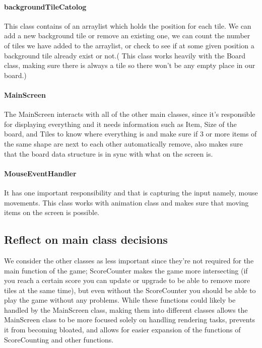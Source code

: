 \documentclass{article}
\begin{document}
\paragraph{backgroundTileCatolog} This class contains of an arraylist which holds the position for each tile. We can add a new background tile or remove an existing one, we can count the number of tiles we have added to the arraylist, or check to see if at some given position a background tile already exist or not.( This class works heavily with the Board class, making sure there is always a tile so there won’t be any empty place in our board.)


\paragraph{MainScreen} The MainScreen interacts with all of the other main classes, since it’s responsible for displaying everything and it needs information such as Item, Size of the board, and Tiles to know where everything is and make sure if 3 or more items of the same shape are next to each other automatically remove, also makes sure that the board data structure is in sync with what on the screen is.



\paragraph{MouseEventHandler}  It has one important responsibility and that is capturing the input namely, mouse movements. This class works with animation class and makes sure that moving items on the screen is possible.

\subsection{Reflect on main class decisions}
We consider the other classes as less important since they’re not required for the main function of the game; ScoreCounter makes the game more intersecting (if you reach a certain score you can  update or upgrade to be able to remove more tiles at the same time), but even without the ScoreCounter you should be able to play the game without any problems.
While these functions could likely be handled by the MainScreen class, making them into different classes allows the MainScreen class to be more focused solely on handling rendering tasks, prevents it from becoming bloated, and allows for easier expansion of the functions of ScoreCounting and other functions.
\end{document}
